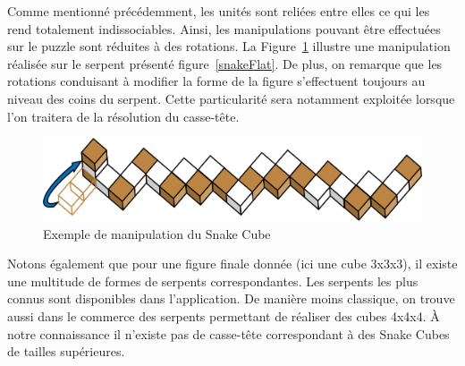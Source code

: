 \newpage Comme mentionné précédemment, les unités sont reliées entre elles ce qui les rend totalement indissociables. Ainsi, les manipulations pouvant être effectuées sur le puzzle sont réduites à des rotations. La Figure~\ref{snakeMove} illustre une manipulation réalisée sur le serpent présenté figure~\ref{snakeFlat}. De plus, on remarque que les rotations conduisant à modifier la forme de la figure s’effectuent toujours au niveau des coins du serpent. Cette particularité sera notamment exploitée lorsque l’on traitera de la résolution du casse-tête.

\begin{figure}[h]
 \centering
 \includegraphics[scale=0.3,keepaspectratio=true]{img/snakeCubeMove.png}
 \caption{Exemple de manipulation du Snake Cube}
 \label{snakeMove}
\end{figure}

Notons également  que pour une figure finale donnée (ici une cube 3x3x3), il existe une multitude de formes de serpents correspondantes. Les serpents les plus connus sont disponibles dans l'application. De manière moins classique, on trouve aussi dans le commerce des serpents permettant de réaliser des cubes 4x4x4. À notre connaissance il n’existe pas de casse-tête correspondant à des Snake Cubes de tailles supérieures.
